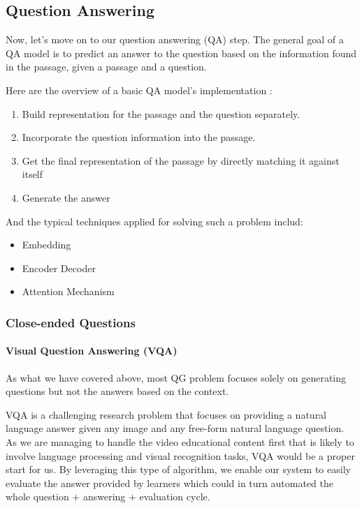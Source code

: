 \documentclass[]{book}
\let\oldparagraph\paragraph
\renewcommand{\paragraph}[1]{\oldparagraph{#1}\mbox{}}
\theoremstyle{definition}
\theoremstyle{definition}
\theoremstyle{definition}
\theoremstyle{remark}
\begin{document}
\subsection{Question Answering}\label{question-answering}

Now, let's move on to our question answering (QA) step. The general goal
of a QA model is to predict an answer to the question based on the
information found in the passage, given a passage and a question.

Here are the overview of a basic QA model's implementation
\citep{qa_imp}:

\begin{enumerate}
\def\labelenumi{\arabic{enumi}.}
\item
  Build representation for the passage and the question separately.
\item
  Incorporate the question information into the passage.
\item
  Get the final representation of the passage by directly matching it
  against itself
\item
  Generate the answer
\end{enumerate}

And the typical techniques applied for solving such a problem includ:

\begin{itemize}
\item
  Embedding
\item
  Encoder Decoder
\item
  Attention Mechanism
\end{itemize}

\subsubsection{Close-ended Questions}\label{close-ended-questions}

\paragraph{Visual Question Answering
(VQA)}\label{visual-question-answering-vqa}

As what we have covered above, most QG problem focuses solely on
generating questions but not the answers based on the context.

VQA is a challenging research problem that focuses on providing a
natural language answer given any image and any free-form natural
language question. As we are managing to handle the video educational
content first that is likely to involve language processing and visual
recognition tasks, VQA would be a proper start for us. By leveraging
this type of algorithm, we enable our system to easily evaluate the
answer provided by learners which could in turn automated the whole
question + answering + evaluation cycle.
\end{document}

